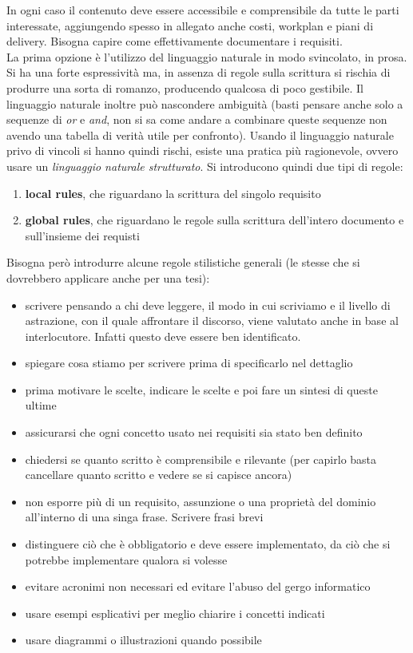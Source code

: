 In ogni caso il contenuto deve essere accessibile e comprensibile da tutte le parti interessate, aggiungendo spesso in allegato anche costi, workplan e piani di delivery. Bisogna capire come effettivamente documentare i requisiti.\\ La prima opzione è l'utilizzo del linguaggio naturale in modo svincolato, in prosa. Si ha una forte espressività ma, in assenza di regole sulla scrittura si rischia di produrre una sorta di romanzo, producendo qualcosa di poco gestibile. Il linguaggio naturale inoltre può nascondere ambiguità (basti pensare anche solo a sequenze di \textit{or} e \textit{and}, non si sa come andare a combinare queste sequenze non avendo una tabella di verità utile per confronto). Usando il linguaggio naturale privo di vincoli si hanno quindi rischi, esiste una pratica più ragionevole, ovvero usare un \textit{linguaggio naturale strutturato}. Si introducono quindi due tipi di regole:
\begin{enumerate}
  \item \textbf{local rules}, che riguardano la scrittura del singolo requisito
  \item \textbf{global rules}, che riguardano le regole sulla scrittura dell'intero documento e sull'insieme dei requisti
\end{enumerate}
Bisogna però introdurre alcune regole stilistiche generali (le stesse che si dovrebbero applicare anche per una tesi):
\begin{itemize}
  \item scrivere pensando a chi deve leggere, il modo in cui scriviamo e il livello di astrazione, con il quale affrontare il discorso, viene valutato anche in base al interlocutore. Infatti questo deve essere ben identificato.
  \item spiegare cosa stiamo per scrivere prima di specificarlo nel dettaglio
  \item prima motivare le scelte, indicare le scelte e poi fare un sintesi di queste ultime
  \item assicurarsi che ogni concetto usato nei requisiti sia stato ben definito 
  \item chiedersi se quanto scritto è comprensibile e rilevante (per capirlo basta cancellare quanto scritto e vedere se si capisce ancora)
  \item non esporre più di un requisito, assunzione o una proprietà del dominio all'interno di una singa frase. Scrivere frasi brevi
  \item distinguere ciò che è obbligatorio e deve essere implementato, da ciò che si potrebbe implementare qualora si volesse
  \item evitare acronimi non necessari ed evitare l'abuso del gergo informatico
  \item usare esempi esplicativi per meglio chiarire i concetti indicati
  \item usare diagrammi o illustrazioni quando possibile
\end{itemize} 
